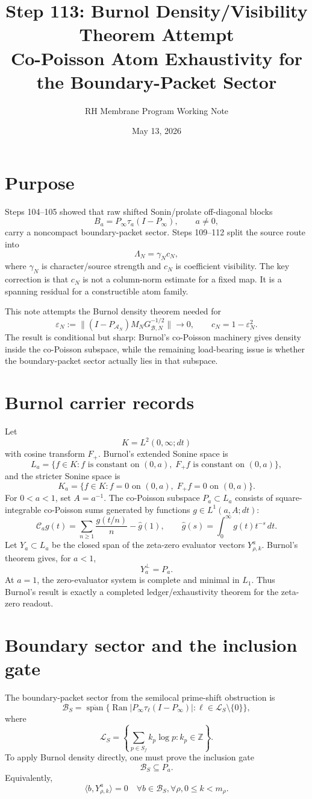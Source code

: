 \documentclass[11pt]{article}
\title{Step 113: Burnol Density/Visibility Theorem Attempt\\\large Co-Poisson Atom Exhaustivity for the Boundary-Packet Sector}
\author{RH Membrane Program Working Note}
\date{May 13, 2026}
\newcommand{\B}{\mathcal B}
\newcommand{\A}{\mathcal A}
\newcommand{\C}{\mathcal C}
\newcommand{\eps}{\varepsilon}
\newcommand{\spanop}{\operatorname{span}}
\newcommand{\Ran}{\operatorname{Ran}}
\begin{document}
\maketitle

\section{Purpose}
Steps 104--105 showed that raw shifted Sonin/prolate off-diagonal blocks
\[
  B_a=P_\infty\tau_a(I-P_\infty),\qquad a\ne0,
\]
carry a noncompact boundary-packet sector.  Steps 109--112 split the source route into
\[
  \Lambda_N=\gamma_Nc_N,
\]
where \(\gamma_N\) is character/source strength and \(c_N\) is coefficient visibility.  The key correction is that \(c_N\) is not a column-norm estimate for a fixed map.  It is a spanning residual for a constructible atom family.

This note attempts the Burnol density theorem needed for
\[
  \eps_N:=\|(I-P_{\A_N})M_NG_{\B,N}^{-1/2}\|\to0,
  \qquad
  c_N=1-\eps_N^2.
\]
The result is conditional but sharp: Burnol's co-Poisson machinery gives density inside the co-Poisson subspace, while the remaining load-bearing issue is whether the boundary-packet sector actually lies in that subspace.

\section{Burnol carrier records}
Let
\[
  K=L^2(0,\infty;dt)
\]
with cosine transform \(F_+\).  Burnol's extended Sonine space is
\[
  L_a=\{f\in K: f\text{ is constant on }(0,a),\;F_+f\text{ is constant on }(0,a)\},
\]
and the stricter Sonine space is
\[
  K_a=\{f\in K: f=0\text{ on }(0,a),\;F_+f=0\text{ on }(0,a)\}.
\]
For \(0<a<1\), set \(A=a^{-1}\).  The co-Poisson subspace \(P_a\subset L_a\) consists of square-integrable co-Poisson sums generated by functions \(g\in L^1(a,A;dt)\):
\[
  \C_a g(t)=\sum_{n\ge1}\frac{g(t/n)}{n}-\widehat g(1),
  \qquad
  \widehat g(s)=\int_0^\infty g(t)t^{-s}\,dt.
\]
Let \(Y_a\subset L_a\) be the closed span of the zeta-zero evaluator vectors \(Y^a_{\rho,k}\). Burnol's theorem gives, for \(a<1\),
\[
  \boxed{Y_a^\perp=P_a.}
\]
At \(a=1\), the zero-evaluator system is complete and minimal in \(L_1\). Thus Burnol's result is exactly a completed ledger/exhaustivity theorem for the zeta-zero readout.

\section{Boundary sector and the inclusion gate}
The boundary-packet sector from the semilocal prime-shift obstruction is
\[
  \B_S=
  \overline{\spanop}\{\Ran |P_\infty\tau_\ell(I-P_\infty)|:
  \ell\in \mathcal L_S\setminus\{0\}\},
\]
where
\[
  \mathcal L_S=\left\{\sum_{p\in S_f}k_p\log p:k_p\in\mathbb Z\right\}.
\]
To apply Burnol density directly, one must prove the inclusion gate
\[
  \boxed{\B_S\subseteq P_a.}
\]
Equivalently,
\[
  \boxed{\langle b,Y^a_{\rho,k}\rangle=0
  \quad\forall b\in\B_S,
  \forall\rho,
  0\le k<m_\rho.}
\]
\end{document}

